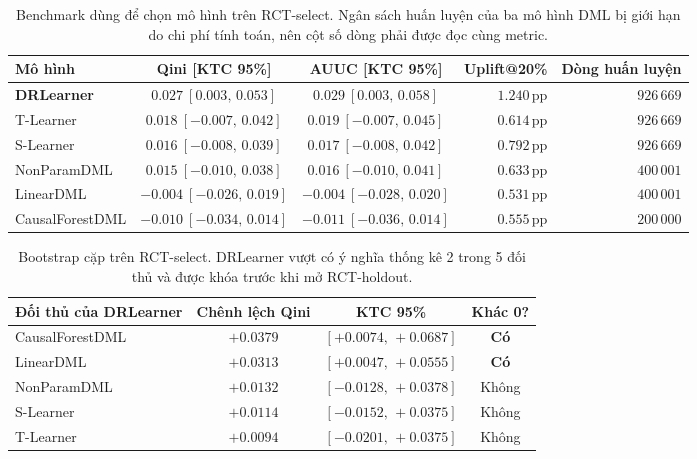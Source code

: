 \documentclass[11pt,a4paper]{article}
\DeclareRobustCommand{\code}[1]{{\small\texttt{#1}}}
\newcommand{\pp}{\ensuremath{\,\text{pp}}}
\def\code#1{#1}%
\begin{document}
\begin{table}[H]
\centering
\scriptsize
\begin{tabular}{@{}lccrr@{}}
\toprule
\textbf{Mô hình} & \textbf{Qini [KTC 95\%]} & \textbf{AUUC [KTC 95\%]} & \textbf{Uplift@20\%} & \textbf{Dòng huấn luyện} \\
\midrule
\textbf{DRLearner} & \textbf{$0.027\ [0.003,\,0.053]$} & $0.029\ [0.003,\,0.058]$ & $1.240\pp$ & $926\,669$ \\
T-Learner & $0.018\ [-0.007,\,0.042]$ & $0.019\ [-0.007,\,0.045]$ & $0.614\pp$ & $926\,669$ \\
S-Learner & $0.016\ [-0.008,\,0.039]$ & $0.017\ [-0.008,\,0.042]$ & $0.792\pp$ & $926\,669$ \\
NonParamDML & $0.015\ [-0.010,\,0.038]$ & $0.016\ [-0.010,\,0.041]$ & $0.633\pp$ & $400\,001$ \\
LinearDML & $-0.004\ [-0.026,\,0.019]$ & $-0.004\ [-0.028,\,0.020]$ & $0.531\pp$ & $400\,001$ \\
CausalForestDML & $-0.010\ [-0.034,\,0.014]$ & $-0.011\ [-0.036,\,0.014]$ & $0.555\pp$ & $200\,000$ \\
\bottomrule
\end{tabular}
\caption{Benchmark dùng để chọn mô hình trên \code{RCT-select}. Ngân sách
huấn luyện của ba mô hình DML bị giới hạn do chi phí tính toán, nên cột số
dòng phải được đọc cùng metric.}
\label{tab:rct-select-benchmark}
\end{table}

\begin{table}[H]
\centering
\small
\begin{tabular}{@{}lccc@{}}
\toprule
\textbf{Đối thủ của DRLearner} & \textbf{Chênh lệch Qini} & \textbf{KTC 95\%} & \textbf{Khác 0?} \\
\midrule
CausalForestDML & $+0.0379$ & $[+0.0074,\,+0.0687]$ & \textbf{Có} \\
LinearDML & $+0.0313$ & $[+0.0047,\,+0.0555]$ & \textbf{Có} \\
NonParamDML & $+0.0132$ & $[-0.0128,\,+0.0378]$ & Không \\
S-Learner & $+0.0114$ & $[-0.0152,\,+0.0375]$ & Không \\
T-Learner & $+0.0094$ & $[-0.0201,\,+0.0375]$ & Không \\
\bottomrule
\end{tabular}
\caption{Bootstrap cặp trên \code{RCT-select}. DRLearner vượt có ý nghĩa
thống kê 2 trong 5 đối thủ và được khóa trước khi mở \code{RCT-holdout}.}
\label{tab:rct-select-pairwise}
\end{table}
\end{document}
